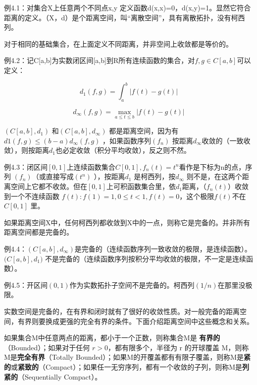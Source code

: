 \kaishu
\setlength{\leftskip}{1em}

例4.1：对集合X上任意两个不同点x,y 定义函数d(x,x)=0，d(x,y)=1。显然它符合距离的定义。（X，d）是个距离空间，叫``离散空间''，具有离散拓扑，没有柯西列。

\songti
\setlength{\leftskip}{0em}

对于相同的基础集合，在上面定义不同距离，并非空间上收敛都是等价的。

\kaishu
\setlength{\leftskip}{1em}

例4.2：记C[a,b]为实数闭区间[a,b]到R所有连续函数的集合，对$ f,g\in C[a,b] $可以定义：

\[ \displaystyle d_1(f,g) = \int_{a}^{b}|f(t)-g(t)| \]

\[ \displaystyle d_\infty(f,g) = \max_{a\leq t \leq b} |f(t)-g(t)|\]

\songti
\setlength{\leftskip}{0em}

$ (C[a,b],d_1) $ 和$ (C[a,b],d_\infty) $ 都是距离空间，因为有 $\displaystyle  d1(f,g)\leq (b−a)d_\infty(f,g) $ ，如果函数序列$ (f_n) $ 按距离$ d_\infty $收敛的（一致收敛），则按距离$ d_1 $也必定收敛（积分平均收敛），反之则不然。

\kaishu
\setlength{\leftskip}{1em}

例4.3：闭区间$ [0,1] $上连续函数集合$ C[0,1], f_n(t)=t^n $看作是下标为n的点，序列 $ (f_n) $（或直接写成$ (t^n) $ ），按距离$ d_1 $ 是柯西列，按$ d_\infty $ 则不是，在这两个距离空间上它都不收敛。但在$ [0,1] $上可积函数集合里，依$ d_1 $距离，（$ f_n(t) $）收敛到一个不连续函数 $ f(t): f(1)=1,0\leq t<1,f(t)=0 $，这个极限$ f(t) $不在$ C[0,1] $ 里。

\songti
\setlength{\leftskip}{0em}

如果距离空间X中，任何柯西列都收敛到X中的一点，则称它是完备的。并非所有距离空间都是完备的。

\kaishu
\setlength{\leftskip}{1em}

例4.4：$ (C[a,b],d_\infty) $是完备的（连续函数序列一致收敛的极限，是连续函数）。$ (C[a,b],$$d_1) $ 不是完备的（连续函数序列按积分平均收敛的极限，不一定是连续函数）。

例4.5：开区间$ (0, 1) $作为实数拓扑子空间不是完备的。柯西列$ (1/n) $在那里没极限。

\songti
\setlength{\leftskip}{0em}

实数空间是完备的，在有界和闭时就有了很好的收敛性质。对一般完备的距离空间，有界则要换成更强的完全有界的条件。下面介绍距离空间中这些概念和关系。

如果集合M中任意两点的距离，都小于一个正数，则称集合M是 \textbf{有界的} （Bounded）；如果对于任何 $ r> 0 $，都有限多个，半径为 r 的开球覆盖 M，则称M是\textbf{完全有界}（Totally   Bounded）；如果M的开覆盖都有有限子覆盖，则称M是\textbf{紧的}或\textbf{紧致的}（Compact）；如果任一无穷序列，都有一个收敛的子列，则称M是\textbf{列紧的}（Sequentially Compact）。


